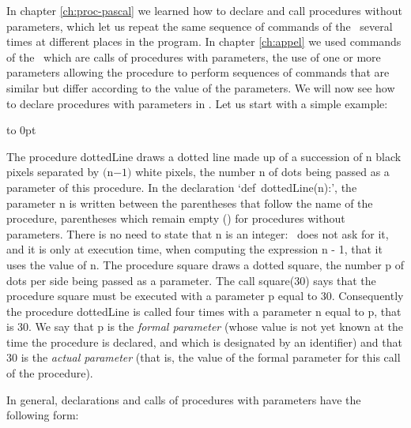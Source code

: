 In chapter \ref{ch:proc-pascal} we learned how to declare and call procedures without parameters,
which let us repeat the same sequence of commands of the
\robot\ several times at different places in the program. In chapter \ref{ch:appel} we
used commands of the \robot\ which are calls of procedures with parameters,
the use of one or more parameters al\-low\-ing the procedure to perform sequences
of commands that are similar but differ according to the value of the parameters. We will now
see how to declare procedures with parameters in \python. Let us start
with a simple example:

\bigskip

 {\raggedright 
 {}\hfill\vbox to 0pt{\vspace*{\baselineskip}\vspace*{3cm}
 }\hspace*{30mm}%
 \label{prog:CarrePointille}
 
 }
The procedure {\idt dottedLine} draws a dotted line made up of a succession of
{\idt n} black pixels separated by $(${\idt n}$ - 1)$ white pixels, the num\-ber {\idt n} of dots being
passed as a parameter of this procedure. In the declaration `{\mcl def}\ {\idt dottedLine(n):}',
the parameter {\idt n} is written between the parentheses that follow the name of the procedure,
parentheses which remain empty {\idt ()} for procedures without parameters. There is no need to state that {\idt n} is
an integer: \python\ does not ask for it, and it is only at execution time,
when computing the expression {\idt n - 1}, that it uses the value of {\idt n}.
The procedure {\idt square} draws a dotted
square, the number {\idt p} of dots per side being passed as a parameter. The call {\idt square(30)}
says that the procedure {\idt square} must be executed with a parameter {\idt p} equal to 30. Consequently the
procedure {\idt dottedLine} is called four times with a parameter {\idt n} equal to {\idt p}, that is
30. We say that {\idt p} is the {\em formal parameter}  (whose value is not yet known
at the time the procedure is declared, and which is designated by an identifier) and that 
30 is the {\em actual parameter} (that is,
the value of the formal parameter for this call of the procedure).

In general, declarations and calls of procedures with pa\-ram\-e\-ters have the following
form:


